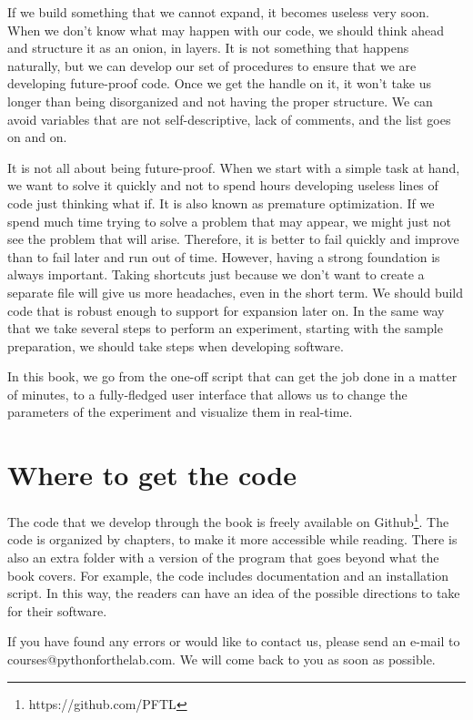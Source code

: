 If we build something that we cannot expand, it becomes useless very soon. When we don't know what may happen with our code, we should think ahead and structure it as an onion, in layers. It is not something that happens naturally, but we can develop our set of procedures to ensure that we are developing future-proof code. Once we get the handle on it, it won't take us longer than being disorganized and not having the proper structure. We can avoid variables that are not self-descriptive, lack of comments, and the list goes on and on.

It is not all about being future-proof. When we start with a simple task at hand, we want to solve it quickly and not to spend hours developing useless lines of code just thinking what if. It is also known as premature optimization. If we spend much time trying to solve a problem that may appear, we might just not see the problem that will arise. Therefore, it is better to fail quickly and improve than to fail later and run out of time. However, having a strong foundation is always important. Taking shortcuts just because we don't want to create a separate file will give us more headaches, even in the short term. We should build code that is robust enough to support for expansion later on. In the same way that we take several steps to perform an experiment, starting with the sample preparation, we should take steps when developing software.

In this book, we go from the one-off script that can get the job done in a matter of minutes, to a fully-fledged user interface that allows us to change the parameters of the experiment and visualize them in real-time.

\section{Where to get the code}
The code that we develop through the book is freely available on Github\footnote{https://github.com/PFTL}. The code is organized by chapters, to make it more accessible while reading. There is also an extra folder with a version of the program that goes beyond what the book covers. For example, the code includes documentation and an installation script. In this way, the readers can have an idea of the possible directions to take for their software.

If you have found any errors or would like to contact us, please send an e-mail to courses@pythonforthelab.com. We will come back to you as soon as possible.

